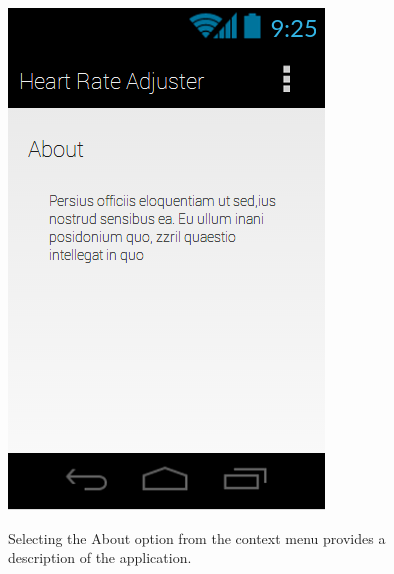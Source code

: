\documentclass[letterpaper,english, 12pt]{scrreprt}
\begin{document}
\begin{figure}[H]
	\centering
	\includegraphics{img/mobile_ui/6.png}\\
	\caption{Selecting the About option from the context menu provides a description of the application.}
\end{figure}
\end{document}
